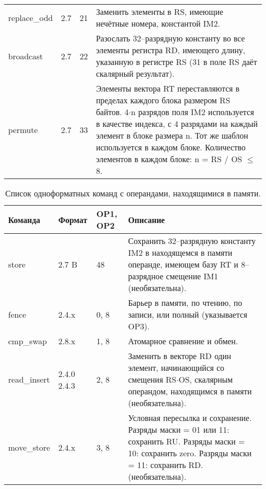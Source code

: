 \documentclass[forwardcom.tex]{subfiles}
\begin{document}
\begin{longtable}{|p{25mm}|p{16mm}|p{9mm}|p{99mm}|}
replace\_odd     & 2.7 & 21 & Заменить элементы в RS, имеющие нечётные номера, константой IM2. \\
broadcast        & 2.7 & 22 & Разослать 32--разрядную константу во все элементы регистра RD, имеющего длину, указанную в регистре RS (31 в поле RS даёт скалярный результат). \\
permute          & 2.7 & 33 & Элементы вектора RT переставляются в пределах каждого блока размером RS байтов. 4$\cdot$n разрядов поля IM2 используется в качестве индекса, с 4 разрядами на каждый элемент в блоке размера  n. Тот же шаблон используется в каждом блоке. Количество элементов в каждом блоке: n = RS / OS $\leq$ 8. \\ \hline
\end{longtable}

\begin{longtable}{|p{25mm}|p{16mm}|p{9mm}|p{99mm}|}
\caption{Список одноформатных команд с операндами, находящимися в памяти.} 
\label{table:ListOfSingleFormatInstructionsMemory} \\
\endfirsthead
\endhead
\hline
\bfseries Команда & \bfseries Формат &\bfseries OP1, OP2 & \bfseries Описание \\ \hline
store             & 2.7 B            & 48                & Сохранить 32--разрядную константу IM2 в находящемся в памяти операнде, имеющем базу RT и 8--разрядное смещение IM1 (необязательна). \\
fence             & 2.4.x            & 0, 8              & Барьер в памяти, по чтению, по записи, или полный (указывается OP3).  \\
cmp\_swap         & 2.8.x            & 1, 8              & Атомарное сравнение и обмен.  \\
read\_insert      & 2.4.0 2.4.3      & 2, 8              & Заменить в векторе RD один элемент, начинающийся со смещения RS$\cdot$OS, скалярным операндом, находящимся в памяти (необязательна).  \\
move\_store       & 2.4.x            & 3, 8              & Условная пересылка и сохранение.\newline
                               Разряды маски = 01 или 11: сохранить RU.\newline 
                               Разряды маски = 10: сохранить zero. \newline
                               Разряды маски = 11: сохранить RD. \newline
                               (необязательна). \\

\end{longtable}
\end{document}
